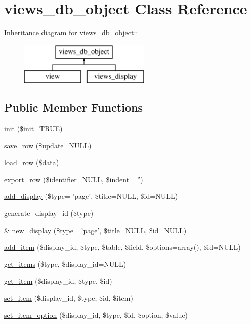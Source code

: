 \hypertarget{classviews__db__object}{
\section{views\_\-db\_\-object Class Reference}
\label{classviews__db__object}
}
Inheritance diagram for views\_\-db\_\-object::\begin{figure}[H]
\begin{center}
\leavevmode
\includegraphics[height=2cm]{classviews__db__object}
\end{center}
\end{figure}
\subsection*{Public Member Functions}
\begin{DoxyCompactItemize}
\item 
\hyperlink{classviews__db__object_a5c50d8a10b9af37afa7c7c2bfde5e318}{init} (\$init=TRUE)
\item 
\hyperlink{classviews__db__object_a5e126880af73008d7ce245c24cfaebab}{save\_\-row} (\$update=NULL)
\item 
\hyperlink{classviews__db__object_a4c8b658c58eb3ae319616f73a2106324}{load\_\-row} (\$data)
\item 
\hyperlink{classviews__db__object_a0b0485d179ad553228534ae957e0ddc9}{export\_\-row} (\$identifier=NULL, \$indent= '')
\item 
\hyperlink{classviews__db__object_a6e9c2b7bb3d5670fefde14518a38de95}{add\_\-display} (\$type= 'page', \$title=NULL, \$id=NULL)
\item 
\hyperlink{classviews__db__object_ac768fb998e23528d06fcb139846094eb}{generate\_\-display\_\-id} (\$type)
\item 
\& \hyperlink{classviews__db__object_ab7a8ea5c81d0c335d8e0fb87443349a3}{new\_\-display} (\$type= 'page', \$title=NULL, \$id=NULL)
\item 
\hyperlink{classviews__db__object_a794e8375c5d243e52645675b31251ccc}{add\_\-item} (\$display\_\-id, \$type, \$table, \$field, \$options=array(), \$id=NULL)
\item 
\hyperlink{classviews__db__object_a20a7ac553af0e4e8ee6f676dce4b844b}{get\_\-items} (\$type, \$display\_\-id=NULL)
\item 
\hyperlink{classviews__db__object_a9c1010d4c58ebbda357940ac11c48ce1}{get\_\-item} (\$display\_\-id, \$type, \$id)
\item 
\hyperlink{classviews__db__object_a4ac5fda69733790427be9edd7c717568}{set\_\-item} (\$display\_\-id, \$type, \$id, \$item)
\item 
\hyperlink{classviews__db__object_a722d39805c26c9ae909e644f2f887a86}{set\_\-item\_\-option} (\$display\_\-id, \$type, \$id, \$option, \$value)
\end{DoxyCompactItemize}
